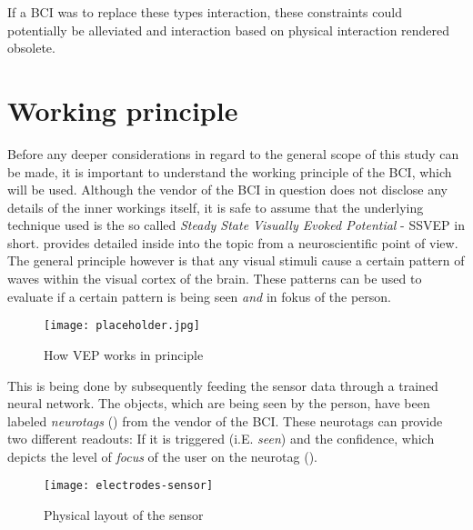             If a BCI was to replace these types interaction, these constraints could potentially be alleviated and interaction based on physical interaction rendered obsolete. 

        \section{Working principle}\label{working-principle}         

            Before any deeper considerations in regard to the general scope of this study can be made, it is important to understand the working principle of the BCI, which will be used. Although the vendor of the BCI in question does not disclose any details of the inner workings itself, it is safe to assume that the underlying technique used is the so called \textit{Steady State Visually Evoked Potential} - SSVEP in short. \cite{Sokol.1976} provides detailed inside into the topic from a neuroscientific point of view. The general principle however is that any visual stimuli cause a certain pattern of waves within the visual cortex of the brain. These patterns can be used to evaluate if a certain pattern is being seen \textit{and} in fokus of the person. 
            
            \begin{figure}[h]     %
                \centering
                \texttt{[image: placeholder.jpg]} 
                \caption{How VEP works in principle }\label{vep-principle}
            \end{figure}            
            
            This is being done by subsequently feeding the sensor data through a trained neural network. The objects, which are being seen by the person, have been labeled \textit{neurotags} (\cite{NextMind.23112020}) from the vendor of the BCI. These neurotags can provide two different readouts: If it is triggered (i.E. \textit{seen}) and the confidence, which depicts the level of \textit{focus} of the user on the neurotag (\cite{NextMind.18112020}).
            
            \begin{figure}[h]     %
                \centering
                \texttt{[image: electrodes-sensor]} 
                \caption{Physical layout of the sensor}\label{electrodes-sensor}
            \end{figure}
            
